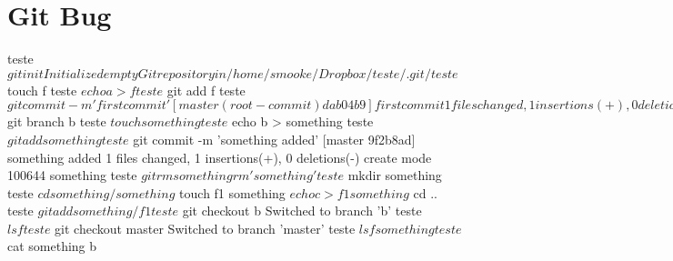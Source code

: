 \section{Git Bug}
teste $ git init
   Initialized empty Git repository in /home/smooke/Dropbox/teste/.git/
teste $ touch f
teste $ echo a > f
teste $ git add f
teste $ git commit -m 'first commit'
   [master (root-commit) dab04b9] first commit
   1 files changed, 1 insertions(+), 0 deletions(-)
   create mode 100644 f
teste $ git branch b
teste $ touch something
teste $ echo b > something
teste $ git add something
teste $ git commit -m 'something added'
   [master 9f2b8ad] something added
   1 files changed, 1 insertions(+), 0 deletions(-)
   create mode 100644 something
teste $ git rm something
   rm 'something'
teste $ mkdir something
teste $ cd something/
something $ touch f1
something $ echo c > f1
something $ cd ..
teste $ git add something/f1
teste $ git checkout b
   Switched to branch 'b'
teste $ ls
   f
teste $ git checkout master
   Switched to branch 'master'
teste $ ls
   f  something
teste $ cat something
   b

